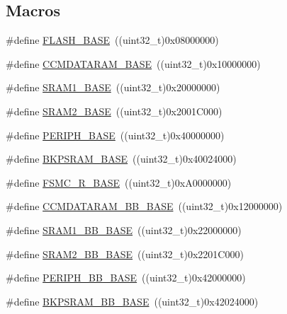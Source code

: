 \subsection*{Macros}
\begin{DoxyCompactItemize}
\item 
\#define \hyperlink{group___peripheral__memory__map_ga23a9099a5f8fc9c6e253c0eecb2be8db}{F\+L\+A\+S\+H\+\_\+\+B\+A\+SE}~((uint32\+\_\+t)0x08000000)
\item 
\#define \hyperlink{group___peripheral__memory__map_gabea1f1810ebeac402164b42ab54bcdf9}{C\+C\+M\+D\+A\+T\+A\+R\+A\+M\+\_\+\+B\+A\+SE}~((uint32\+\_\+t)0x10000000)
\item 
\#define \hyperlink{group___peripheral__memory__map_ga7d0fbfb8894012dbbb96754b95e562cd}{S\+R\+A\+M1\+\_\+\+B\+A\+SE}~((uint32\+\_\+t)0x20000000)
\item 
\#define \hyperlink{group___peripheral__memory__map_gadbb42a3d0a8a90a79d2146e4014241b1}{S\+R\+A\+M2\+\_\+\+B\+A\+SE}~((uint32\+\_\+t)0x2001\+C000)
\item 
\#define \hyperlink{group___peripheral__memory__map_ga9171f49478fa86d932f89e78e73b88b0}{P\+E\+R\+I\+P\+H\+\_\+\+B\+A\+SE}~((uint32\+\_\+t)0x40000000)
\item 
\#define \hyperlink{group___peripheral__memory__map_ga52e57051bdf8909222b36e5408a48f32}{B\+K\+P\+S\+R\+A\+M\+\_\+\+B\+A\+SE}~((uint32\+\_\+t)0x40024000)
\item 
\#define \hyperlink{group___peripheral__memory__map_gaddf0e199dccba83272b20c9fb4d3aaed}{F\+S\+M\+C\+\_\+\+R\+\_\+\+B\+A\+SE}~((uint32\+\_\+t)0x\+A0000000)
\item 
\#define \hyperlink{group___peripheral__memory__map_gaf98d1f99ecd952ee59e80b345d835bb0}{C\+C\+M\+D\+A\+T\+A\+R\+A\+M\+\_\+\+B\+B\+\_\+\+B\+A\+SE}~((uint32\+\_\+t)0x12000000)
\item 
\#define \hyperlink{group___peripheral__memory__map_gac4c4f61082e4b168f29d9cf97dc3ca5c}{S\+R\+A\+M1\+\_\+\+B\+B\+\_\+\+B\+A\+SE}~((uint32\+\_\+t)0x22000000)
\item 
\#define \hyperlink{group___peripheral__memory__map_gac33cb6edadf184ab9860d77089503922}{S\+R\+A\+M2\+\_\+\+B\+B\+\_\+\+B\+A\+SE}~((uint32\+\_\+t)0x2201\+C000)
\item 
\#define \hyperlink{group___peripheral__memory__map_gaed7efc100877000845c236ccdc9e144a}{P\+E\+R\+I\+P\+H\+\_\+\+B\+B\+\_\+\+B\+A\+SE}~((uint32\+\_\+t)0x42000000)
\item 
\#define \hyperlink{group___peripheral__memory__map_gaee19a30c9fa326bb10b547e4eaf4e250}{B\+K\+P\+S\+R\+A\+M\+\_\+\+B\+B\+\_\+\+B\+A\+SE}~((uint32\+\_\+t)0x42024000)

\end{DoxyCompactItemize}
